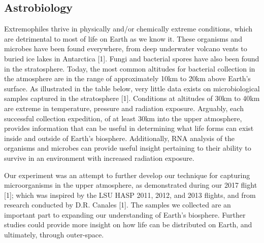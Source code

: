 \subsection{Astrobiology}
\label{sec:Astrobiology-Background}
Extremophiles thrive in physically and/or chemically extreme conditions, which are detrimental to most of life on Earth as we know it. These organisms and microbes have been found everywhere, from deep underwater volcano vents to buried ice lakes in Antarctica [1]. Fungi and bacterial spores have also been found in the stratosphere. Today, the most common altitudes for bacterial collection in the atmosphere are in the range of approximately 10km to 20km above Earth’s surface. As illustrated in the table below, very little data exists on microbiological samples captured in the stratosphere [1]. Conditions at altitudes of 30km to 40km are extreme in temperature, pressure and radiation exposure. Arguably, each successful collection expedition, of at least 30km into the upper atmosphere, provides information that can be useful in determining what life forms can exist inside and outside of Earth’s biosphere. Additionally, RNA analysis of the organisms and microbes can provide useful insight pertaining to their ability to survive in an environment with increased radiation exposure.  

Our experiment was an attempt to further develop our technique for capturing microorganisms in the upper atmosphere, as demonstrated during our 2017 ﬂight [1]; which was inspired by the LSU HASP 2011, 2012, and 2013 ﬂights, and from research conducted by D.R. Canales [1]. The samples we collected are an important part to expanding our understanding of Earth’s biosphere. Further studies could provide more insight on how life can be distributed on Earth, and ultimately, through outer-space.

